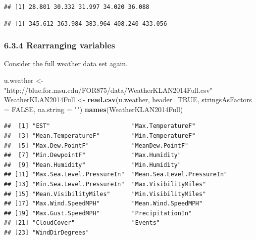\documentclass[]{article}
\newenvironment{Shaded}{\begin{snugshade}}{\end{snugshade}}
\newcommand{\KeywordTok}[1]{\textcolor[rgb]{0.13,0.29,0.53}{\textbf{#1}}}
\newcommand{\DataTypeTok}[1]{\textcolor[rgb]{0.13,0.29,0.53}{#1}}
\newcommand{\DecValTok}[1]{\textcolor[rgb]{0.00,0.00,0.81}{#1}}
\newcommand{\StringTok}[1]{\textcolor[rgb]{0.31,0.60,0.02}{#1}}
\newcommand{\OtherTok}[1]{\textcolor[rgb]{0.56,0.35,0.01}{#1}}
\newcommand{\OperatorTok}[1]{\textcolor[rgb]{0.81,0.36,0.00}{\textbf{#1}}}
\newcommand{\NormalTok}[1]{#1}
\begin{document}
\begin{verbatim}
## [1] 28.801 30.332 31.997 34.020 36.088
\end{verbatim}

\begin{Shaded}
\end{Shaded}

\begin{verbatim}
## [1] 345.612 363.984 383.964 408.240 433.056
\end{verbatim}

\subsubsection{6.3.4 Rearranging variables}\label{rearranging-variables}

Consider the full weather data set again.

\begin{Shaded}
\begin{Highlighting}[]
\NormalTok{u.weather <-}\StringTok{ "http://blue.for.msu.edu/FOR875/data/WeatherKLAN2014Full.csv"}
\NormalTok{WeatherKLAN2014Full <-}\StringTok{ }\KeywordTok{read.csv}\NormalTok{(u.weather, }\DataTypeTok{header=}\OtherTok{TRUE}\NormalTok{,}
                                \DataTypeTok{stringsAsFactors =} \OtherTok{FALSE}\NormalTok{,}
                                \DataTypeTok{na.string =} \StringTok{""}\NormalTok{)}
\KeywordTok{names}\NormalTok{(WeatherKLAN2014Full)}
\end{Highlighting}
\end{Shaded}

\begin{verbatim}
##  [1] "EST"                       "Max.TemperatureF"         
##  [3] "Mean.TemperatureF"         "Min.TemperatureF"         
##  [5] "Max.Dew.PointF"            "MeanDew.PointF"           
##  [7] "Min.DewpointF"             "Max.Humidity"             
##  [9] "Mean.Humidity"             "Min.Humidity"             
## [11] "Max.Sea.Level.PressureIn"  "Mean.Sea.Level.PressureIn"
## [13] "Min.Sea.Level.PressureIn"  "Max.VisibilityMiles"      
## [15] "Mean.VisibilityMiles"      "Min.VisibilityMiles"      
## [17] "Max.Wind.SpeedMPH"         "Mean.Wind.SpeedMPH"       
## [19] "Max.Gust.SpeedMPH"         "PrecipitationIn"          
## [21] "CloudCover"                "Events"                   
## [23] "WindDirDegrees"
\end{verbatim}
\end{document}
